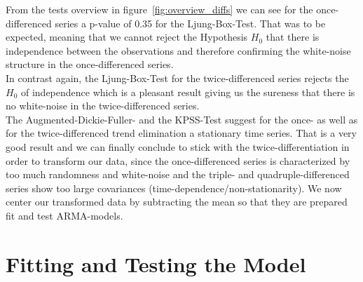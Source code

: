 \documentclass[11pt,a4paper]{article}
\begin{document}
From the tests overview in figure~\ref{fig:overview_diffs}
we can see for the once-differenced series a p-value of 0.35 for the Ljung-Box-Test. That was to be expected, meaning that we cannot reject the Hypothesis $H_0$ that there is independence between the observations \citep{LjungBox78} and therefore confirming the white-noise structure in the once-differenced series. \\
In contrast again, the Ljung-Box-Test for the twice-differenced series rejects the $H_0$ of independence which is a pleasant result giving us the sureness that there is no white-noise in the twice-differenced series.
\\
The Augmented-Dickie-Fuller- and the KPSS-Test suggest for the once- as well as for the twice-differenced trend elimination a stationary time series. That is a very good result and we can finally conclude to stick with the twice-differentiation in order to transform our data, since the once-differenced series is characterized by too much randomness and white-noise and the triple- and quadruple-differenced series show too large covariances (time-dependence/non-stationarity). We now center our transformed data 
by subtracting the mean so that they are prepared fit and test ARMA-models.



\section{Fitting and Testing the Model} \label{Fitting and Testing the Model}
\end{document}
